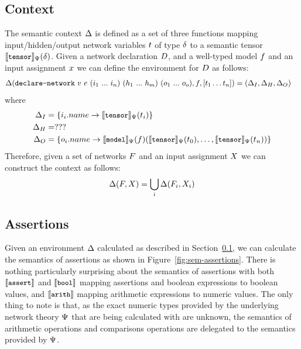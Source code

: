 \subsection{Context}
\label{sec:semantic-context}

The semantic context $\Delta$ is defined as a set of three functions mapping input/hidden/output network variables $t$ of type $\delta$ to a semantic tensor $\llbracket \texttt{\small tensor} \rrbracket_\Psi(\delta)$. 
Given a network declaration $D$, and a well-typed model $f$ and an input assignment $x$ we can define the environment for $D$ as follows:
\begin{align*}
\Delta (\texttt{declare-network} ~ v ~ e ~ (i_1~...~i_n) ~ (h_1~...~h_m) ~ (o_1~...~o_o), f, [t_1 \ldots t_n]) 
& = (\Delta_{I}, \Delta_{H}, \Delta_{O}) 
\end{align*}
where
\begin{align*}
\Delta_{I} 
&= \{ i_i.name \rightarrow \llbracket \texttt{\small tensor} \rrbracket_\Psi(t_i) \}
\\
\Delta_{H} 
&= ???
\\  
\Delta_{O} 
&= \{ o_i.name \rightarrow \llbracket \texttt{\small model} \rrbracket_{\Psi}(f)(\llbracket \texttt{\small tensor} \rrbracket_\Psi(t_0), \ldots, \llbracket \texttt{\small tensor} \rrbracket_\Psi(t_n)) \}
\end{align*}
Therefore, given a set of networks $F$ and an input assignment $X$ we can construct the context as follows:
\begin{equation*}
\Delta (F, X) = \bigcup_i \Delta (F_i, X_i)
\end{equation*}

\subsection{Assertions}

Given an environment $\Delta$ calculated as described in Section~\ref{sec:semantic-context}, we can calculate the semantics of assertions as shown in Figure~\ref{fig:sem-assertions}. 
There is nothing particularly surprising about the semantics of assertions with both $\llbracket \texttt{\small assert} \rrbracket$ and $\llbracket \texttt{\small bool} \rrbracket$ mapping assertions and boolean expressions to boolean values, and $\llbracket \texttt{\small arith} \rrbracket$ mapping arithmetic expressions to numeric values.
The only thing to note is that, as the exact numeric types provided by the underlying network theory $\Psi$ that are being calculated with are unknown, the semantics of arithmetic operations and comparisons operations are delegated to the semantics provided by $\Psi$.

